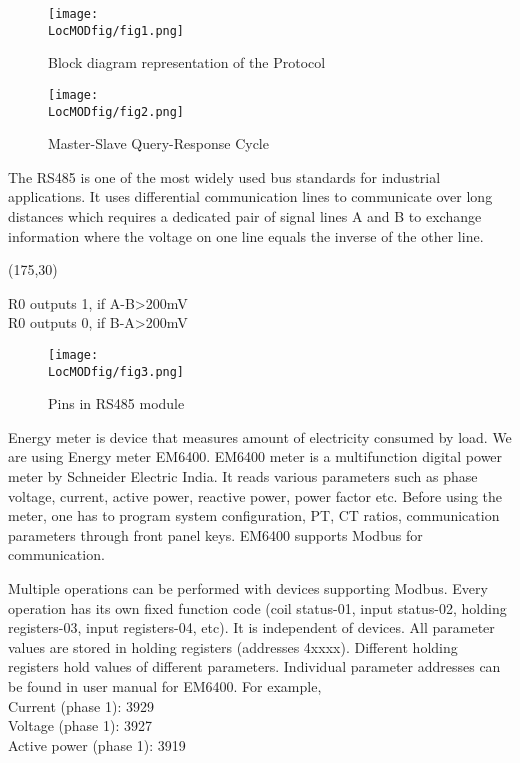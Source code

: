 \begin{figure}
\centering
\texttt{[image: \\LocMODfig/fig1.png]}
\label{fig:mod-block}
\caption{Block diagram representation of the Protocol}
\end{figure}


\begin{figure}
\centering
\texttt{[image: \\LocMODfig/fig2.png]}
\caption{Master-Slave Query-Response Cycle}
\label{fig:mod-master-slave}
\end{figure}

The RS485 is one of the most widely used bus standards for industrial applications. It uses differential communication lines to communicate over long distances which requires a dedicated pair of signal lines A and B to exchange information where the voltage on one line equals the inverse of the other line. 


\begin{center}
\framebox(175,30){%
    \parbox{170\unitlength}{R0 outputs 1, if A-B\textgreater200mV\\ R0 outputs 0, if B-A\textgreater200mV}%
}
\end{center}



\begin{figure}
\centering
\texttt{[image: \\LocMODfig/fig3.png]}
\caption{Pins in RS485 module}
\label{fig:rs-485}
\end{figure}

Energy meter is device that measures amount of electricity consumed by load. We are using Energy meter EM6400. EM6400 meter is a multifunction digital power meter by Schneider Electric India. It reads various parameters such as phase voltage, current, active power, reactive power, power factor etc. Before using the meter, one has to program system configuration, PT, CT ratios, communication parameters through front panel keys. EM6400 supports Modbus for communication.

Multiple operations can be performed with devices supporting Modbus. Every operation has its own fixed function code (coil status-01, input status-02, holding registers-03, input registers-04, etc). It is independent of devices. All parameter values are stored in holding registers (addresses 4xxxx). Different holding registers hold values of different parameters. Individual parameter addresses can be found in user manual for EM6400. 
For example, \\
Current (phase 1): 3929 \\
Voltage (phase 1): 3927 \\
Active power (phase 1): 3919 \\

